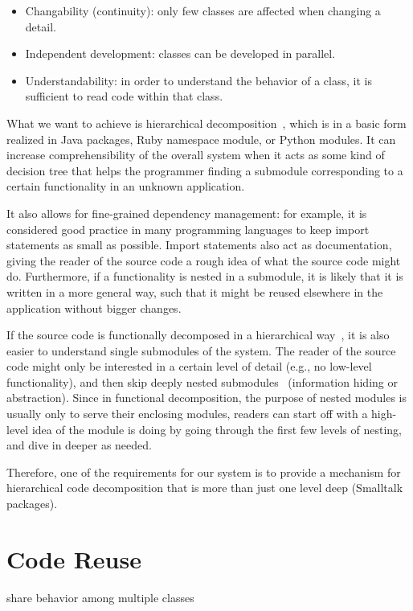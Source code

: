 \begin{itemize}
	\item Changability (continuity): only few classes are affected when changing a detail.
	\item Independent development: classes can be developed in parallel.
	\item Understandability: in order to understand the behavior of a class, it is sufficient to read code within that class.
\end{itemize}

What we want to achieve is hierarchical decomposition~\cite{Blume:1999:HM:325478.325518}, which is in a basic form realized in Java packages, Ruby namespace module, or Python modules. It can increase comprehensibility of the overall system when it acts as some kind of decision tree that helps the programmer finding a submodule corresponding to a certain functionality in an unknown application. 

It also allows for fine-grained dependency management: for example, it is considered good practice in many programming languages to keep import statements as small as possible. Import statements also act as documentation, giving the reader of the source code a rough idea of what the source code might do. Furthermore, if a functionality is nested in a submodule, it is likely that it is written in a more general way, such that it might be reused elsewhere in the application without bigger changes.

If the source code is functionally decomposed in a hierarchical way~\cite{Tsui:2009:ESE:1823101}, it is also easier to understand single submodules of the system. The reader of the source code might only be interested in a certain level of detail (e.g., no low-level functionality), and then skip deeply nested submodules~\cite{hierarch1} (information hiding or abstraction). Since in functional decomposition, the purpose of nested modules is usually only to serve their enclosing modules, readers can start off with a high-level idea of the module is doing by going through the first few levels of nesting, and dive in deeper as needed.

Therefore, one of the requirements for our system is to provide a mechanism for hierarchical code decomposition that is more than just one level deep (Smalltalk packages).

\section{Code Reuse}
share behavior among multiple classes
